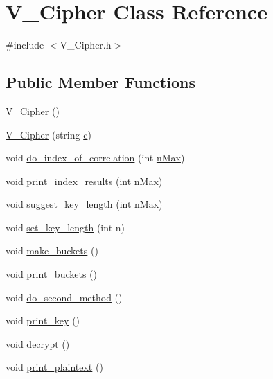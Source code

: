 \hypertarget{classV__Cipher}{}\section{V\+\_\+\+Cipher Class Reference}
\label{classV__Cipher}


{\ttfamily \#include $<$V\+\_\+\+Cipher.\+h$>$}

\subsection*{Public Member Functions}
\begin{DoxyCompactItemize}
\item 
\hyperlink{classV__Cipher_a68ea464beb4da8350ef4fce188064011}{V\+\_\+\+Cipher} ()
\item 
\hyperlink{classV__Cipher_a846e2c926bf669919f19e8f615c7c931}{V\+\_\+\+Cipher} (string \hyperlink{Vigenere__decryptor_8cpp_aed0553574e356f2924be1dba0d5cae85}{c})
\item 
void \hyperlink{classV__Cipher_a662ad132468e1f19bff0363793c73fdb}{do\+\_\+index\+\_\+of\+\_\+correlation} (int \hyperlink{Vigenere__decryptor_8cpp_a23d9f7b5895f47c027059c43a4589e4f}{n\+Max})
\item 
void \hyperlink{classV__Cipher_af1c71fc31c7d46b8482ed8f59639a03b}{print\+\_\+index\+\_\+results} (int \hyperlink{Vigenere__decryptor_8cpp_a23d9f7b5895f47c027059c43a4589e4f}{n\+Max})
\item 
void \hyperlink{classV__Cipher_ab108ffaeeb1eeea99bf00c5f3e31f152}{suggest\+\_\+key\+\_\+length} (int \hyperlink{Vigenere__decryptor_8cpp_a23d9f7b5895f47c027059c43a4589e4f}{n\+Max})
\item 
void \hyperlink{classV__Cipher_af0bc1ef97538ecda35e81919e36a9821}{set\+\_\+key\+\_\+length} (int n)
\item 
void \hyperlink{classV__Cipher_a18c64a8435f0065ca3fe72a6453aba20}{make\+\_\+buckets} ()
\item 
void \hyperlink{classV__Cipher_a784213ea15ccc66b11da6f99a6050145}{print\+\_\+buckets} ()
\item 
void \hyperlink{classV__Cipher_a401617dd530014e12a80e1527e1d4e75}{do\+\_\+second\+\_\+method} ()
\item 
void \hyperlink{classV__Cipher_aeebb82bd8c2b24f6f6fd4de3c6019449}{print\+\_\+key} ()
\item 
void \hyperlink{classV__Cipher_aafe0bf05c4fb25c70da8a1180f346527}{decrypt} ()
\item 
void \hyperlink{classV__Cipher_a390f0f44fe5c02af3a6c53b8f25acb55}{print\+\_\+plaintext} ()
\end{DoxyCompactItemize}

